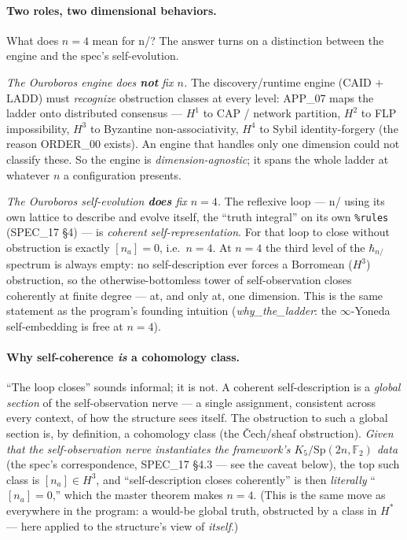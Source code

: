 \documentclass[11pt,a4paper]{article}
\newcommand{\Sp}{\mathrm{Sp}}
\newcommand{\F}{\mathbb{F}}
\newcommand{\hbarn}{\hbar_{n/}}
\theoremstyle{plain}
\theoremstyle{definition}
\theoremstyle{remark}
\begin{document}
\paragraph{Two roles, two dimensional behaviors.} What does $n=4$ mean for n/?
The answer turns on a distinction between the engine and the spec's self-evolution.

\emph{The Ouroboros engine does \textbf{not} fix $n$.} The discovery/runtime engine
(CAID $+$ LADD) must \emph{recognize} obstruction classes at every level: APP\_07
maps the ladder onto distributed consensus --- $H^1$ to CAP / network partition,
$H^2$ to FLP impossibility, $H^3$ to Byzantine non-associativity, $H^4$ to Sybil
identity-forgery (the reason ORDER\_00 exists). An engine that handles only one
dimension could not classify these. So the engine is \emph{dimension-agnostic};
it spans the whole ladder at whatever $n$ a configuration presents.

\emph{The Ouroboros self-evolution \textbf{does} fix $n=4$.} The reflexive loop
--- n/ using its own lattice to describe and evolve itself, the ``truth integral''
on its own \texttt{\%rules} (SPEC\_17 \S4) --- is \emph{coherent self-representation}.
For that loop to close without obstruction is exactly $[n_a]=0$, i.e.\ $n=4$. At
$n=4$ the third level of the $\hbarn$ spectrum is always empty: no
self-description ever forces a Borromean ($H^3$) obstruction, so the
otherwise-bottomless tower of self-observation closes coherently at finite degree
--- at, and only at, one dimension. This is the same statement as the program's
founding intuition (\emph{why\_the\_ladder}: the $\infty$-Yoneda self-embedding is
free at $n=4$).

\paragraph{Why self-coherence \emph{is} a cohomology class.} ``The loop closes''
sounds informal; it is not. A coherent self-description is a \emph{global section}
of the self-observation nerve --- a single assignment, consistent across every
context, of how the structure sees itself. The obstruction to such a global
section is, by definition, a cohomology class (the \v{C}ech/sheaf obstruction).
\emph{Given that the self-observation nerve instantiates the framework's
$K_5/\Sp(2n,\F_2)$ data} (the spec's correspondence, SPEC\_17 \S4.3 --- see the
caveat below), the top such class is $[n_a]\in H^3$, and ``self-description closes
coherently'' is then \emph{literally} ``$[n_a]=0$,'' which the master theorem makes
$n=4$. (This is the same move as everywhere in the program: a would-be global
truth, obstructed by a class in $H^*$ --- here applied to the structure's view of
\emph{itself}.)
\end{document}
